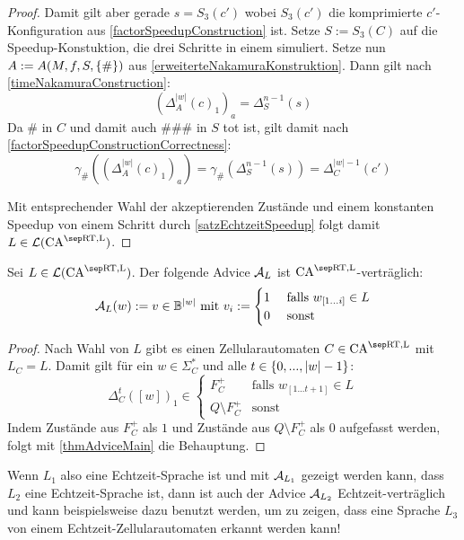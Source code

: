 \begin{proof}
    Damit gilt aber gerade $s = S_3(c')$ wobei $S_3(c')$ die komprimierte $c'$-Konfiguration aus \cref{factorSpeedupConstruction} ist.
    Setze $S := S_3(C)$ auf die Speedup-Konstuktion, die drei Schritte in einem simuliert.
    Setze nun $A := A(M, f, S, \{ {\#} \})$ aus \cref{erweiterteNakamuraKonstruktion}.
    Dann gilt nach \cref{timeNakamuraConstruction}:
    \[
        (\Delta^{ |w| }_A(c)_1)_a = \Delta_S^{n - 1}(s)
    \]
    Da $\#$ in $C$ und damit auch $\#\#\#$ in $S$ tot ist, gilt damit nach \cref{factorSpeedupConstructionCorrectness}:
    \[
        \gamma_\#((\Delta^{ |w| }_A(c)_1)_a) = \gamma_\#(\Delta_S^{n-1}(s)) = \Delta_C^{|w| - 1}(c')
    \]
    
    Mit entsprechender Wahl der akzeptierenden Zustände und einem konstanten Speedup von einem Schritt
    durch \cref{satzEchtzeitSpeedup} folgt damit $L \in \CAL{\CART, \CALeft}$.
\end{proof}

\begin{corollary}
    \label{folgerungThmMainAdv}
    Sei $L \in \CAL{\CART, \CALeft}$.
    Der folgende Advice $\mathcal{A}_L$ ist $\CAM{\CART, \CALeft}$-verträglich:
    \[
        \mathcal{A}_L(w) := v \in \mathbb{B}^{|w|} \text{ mit } v_i :=
        \begin{cases}
            1 & \text{ falls } w_{[1...i]} \in L \\
            0 & \text{ sonst }
        \end{cases}
    \]
\end{corollary}
\begin{proof}
    Nach Wahl von $L$ gibt es einen Zellularautomaten $C \in \CAM{\CART, \CALeft}$
    mit $L_C = L$. Damit gilt für ein $w \in \Sigma_C^*$ und alle $t \in \{ {0, ..., |w|-1} \}$:
    \[
        \Delta_C^{t}([w])_1 \in
        \begin{cases}
            F_C^+ & \text{falls } w_{[1...t+1]} \in L \\
            Q \setminus F_C^+ & \text {sonst}
        \end{cases}
    \]
    Indem Zustände aus $F_C^+$ als $1$ und Zustände aus $Q \setminus F_C^+$ als $0$ aufgefasst werden, 
    folgt mit \cref{thmAdviceMain} die Behauptung.
\end{proof}

Wenn $L_1$ also eine Echtzeit-Sprache ist und mit $\mathcal{A}_{L_1}$ gezeigt werden kann,
dass $L_2$ eine Echtzeit-Sprache ist, dann ist auch der Advice $\mathcal{A}_{L_2}$ Echtzeit-verträglich
und kann beispielsweise dazu benutzt werden, um zu zeigen, dass eine Sprache $L_3$ von einem Echtzeit-Zellularautomaten erkannt werden kann!


